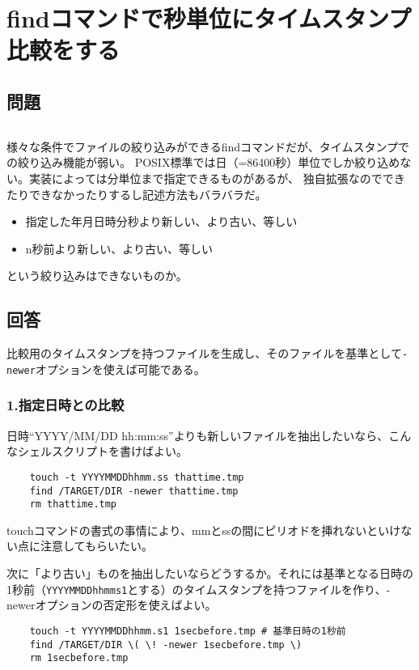 \section{findコマンドで秒単位にタイムスタンプ比較をする}
\label{recipe:timestamp}

\subsection*{問題}
\noindent
$\!\!\!\!\!$
\begin{grshfboxit}{160.0mm}
	様々な条件でファイルの絞り込みができるfindコマンドだが、タイムスタンプでの絞り込み機能が弱い。
	POSIX標準では日（=86400秒）単位でしか絞り込めない。実装によっては分単位まで指定できるものがあるが、
	独自拡張なのでできたりできなかったりするし記述方法もバラバラだ。
	\begin{itemize}
	  \item 指定した年月日時分秒より新しい、より古い、等しい
	  \item n秒前より新しい、より古い、等しい
	\end{itemize}
	という絞り込みはできないものか。
\end{grshfboxit}

\subsection*{回答}
比較用のタイムスタンプを持つファイルを生成し、そのファイルを基準として\verb|-newer|オプションを使えば可能である。

\subsubsection*{1.指定日時との比較}

日時``YYYY/MM/DD hh:mm:ss''よりも新しいファイルを抽出したいなら、こんなシェルスクリプトを書けばよい。\\
\begin{frameboxit}{160.0mm}
\begin{verbatim}
	touch -t YYYYMMDDhhmm.ss thattime.tmp
	find /TARGET/DIR -newer thattime.tmp
	rm thattime.tmp
\end{verbatim}
\end{frameboxit}

touchコマンドの書式の事情により、mmとssの間にピリオドを挿れないといけない点に注意してもらいたい。

次に「より古い」ものを抽出したいならどうするか。それには基準となる日時の1秒前（\verb|YYYYMMDDhhmms1|とする）のタイムスタンプを持つファイルを作り、-newerオプションの否定形を使えばよい。\\
\begin{frameboxit}{160.0mm}
\begin{verbatim}
	touch -t YYYYMMDDhhmm.s1 1secbefore.tmp # 基準日時の1秒前
	find /TARGET/DIR \( \! -newer 1secbefore.tmp \)
	rm 1secbefore.tmp
\end{verbatim}
\end{frameboxit}

